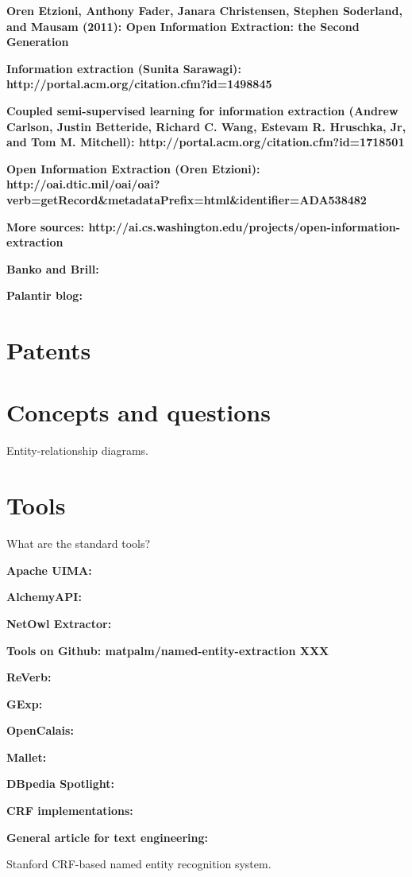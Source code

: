 \textbf{Oren Etzioni, Anthony Fader, Janara Christensen, Stephen Soderland,
and Mausam (2011): Open Information Extraction: the Second Generation}

\textbf{Information extraction (Sunita Sarawagi):
http://portal.acm.org/citation.cfm?id=1498845}

\textbf{Coupled semi-supervised learning for information extraction (Andrew
Carlson, Justin Betteride, Richard C. Wang, Estevam R. Hruschka, Jr,
and Tom M. Mitchell): http://portal.acm.org/citation.cfm?id=1718501}

\textbf{Open Information Extraction (Oren Etzioni):
http://oai.dtic.mil/oai/oai?verb=getRecord\&metadataPrefix=html\&identifier=ADA538482}

\textbf{More sources: http://ai.cs.washington.edu/projects/open-information-extraction}

\textbf{Banko and Brill:}

\textbf{Palantir blog:}

\section{Patents}


\section{Concepts and questions} 

Entity-relationship diagrams.

\section{Tools}

What are the standard tools?

\textbf{Apache UIMA:}

\textbf{AlchemyAPI:}

\textbf{NetOwl Extractor:}

\textbf{Tools on Github: matpalm/named-entity-extraction XXX}

\textbf{ReVerb:}

\textbf{GExp:}

\textbf{OpenCalais:}

\textbf{Mallet:}

\textbf{DBpedia Spotlight:}

\textbf{CRF implementations:}

\textbf{General article for text engineering:}

Stanford CRF-based named entity recognition system.

